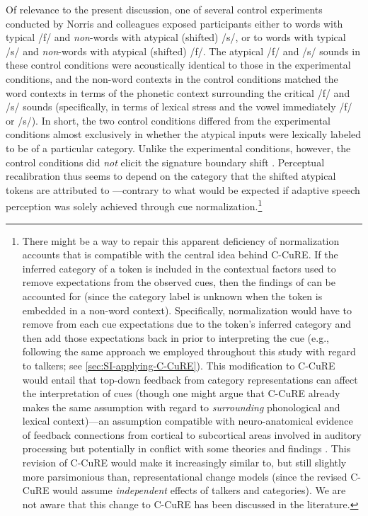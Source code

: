 \documentclass[
  11pt,
  man,floatsintext]{apa6}
\begin{document}
Of relevance to the present discussion, one of several control experiments conducted by Norris and colleagues exposed participants either to words with typical /f/ and \emph{non}-words with atypical (shifted) /s/, or to words with typical /s/ and \emph{non}-words with atypical (shifted) /f/. The atypical /f/ and /s/ sounds in these control conditions were acoustically identical to those in the experimental conditions, and the non-word contexts in the control conditions matched the word contexts in terms of the phonetic context surrounding the critical /f/ and /s/ sounds (specifically, in terms of lexical stress and the vowel immediately /f/ or /s/). In short, the two control conditions differed from the experimental conditions almost exclusively in whether the atypical inputs were lexically labeled to be of a particular category. Unlike the experimental conditions, however, the control conditions did \emph{not} elicit the signature boundary shift \autocite[Experiment 2]{norris2003}. Perceptual recalibration thus seems to depend on the category that the shifted atypical tokens are attributed to \autocite[p.~227]{norris2003}---contrary to what would be expected if adaptive speech perception was solely achieved through cue normalization.\footnote{There might be a way to repair this apparent deficiency of normalization accounts that is compatible with the central idea behind C-CuRE. If the inferred category of a token is included in the contextual factors used to remove expectations from the observed cues, then the findings of \textcite{norris2003} can be accounted for (since the category label is unknown when the token is embedded in a non-word context). Specifically, normalization would have to remove from each cue expectations due to the token's inferred category and then add those expectations back in prior to interpreting the cue (e.g., following the same approach we employed throughout this study with regard to talkers; see \ref{sec:SI-applying-C-CuRE}). This modification to C-CuRE would entail that top-down feedback from category representations can affect the interpretation of cues (though one might argue that C-CuRE already makes the same assumption with regard to \emph{surrounding} phonological and lexical context)---an assumption compatible with neuro-anatomical evidence of feedback connections from cortical to subcortical areas involved in auditory processing but potentially in conflict with some theories and findings \autocites[e.g.,][]{norris2000a,norris-mcqueen2008}. This revision of C-CuRE would make it increasingly similar to, but still slightly more parsimonious than, representational change models (since the revised C-CuRE would assume \emph{independent} effects of talkers and categories). We are not aware that this change to C-CuRE has been discussed in the literature.}
\end{document}
